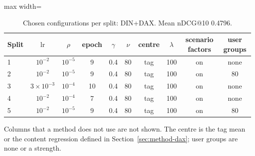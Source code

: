 \begin{table}[tbp]
\centering
\footnotesize
\caption{Chosen configurations per split: DIN+DAX. Mean nDCG@10 0.4796.}
\label{tab:grid09}
\begin{adjustbox}{max width=\linewidth}
\begin{tabular}{lccccccccc}
\toprule
Split & $\mathrm{lr}$ & $\rho$ & epoch & $\gamma$ & $\nu$ & centre & $\lambda$ & scenario factors & user groups \\
\midrule
1 & $10^{-2}$ & $10^{-5}$ & 9 & 0.4 & 80 & tag & 100 & on & none \\
2 & $10^{-2}$ & $10^{-5}$ & 9 & 0.4 & 80 & tag & 100 & on & 80 \\
3 & $3\times10^{-3}$ & $10^{-4}$ & 10 & 0.4 & 80 & tag & 100 & on & none \\
4 & $10^{-2}$ & $10^{-4}$ & 7 & 0.4 & 80 & tag & 100 & on & none \\
5 & $10^{-2}$ & $10^{-5}$ & 9 & 0.4 & 80 & tag & 100 & on & 80 \\
\bottomrule
\end{tabular}
\end{adjustbox}
\par\smallskip
\begin{minipage}{\linewidth}\raggedright\footnotesize Columns that a method does not use are not shown. The centre is the tag mean or the content regression defined in Section~\ref{sec:method-dax}; user groups are none or a strength.\end{minipage}
\end{table}
